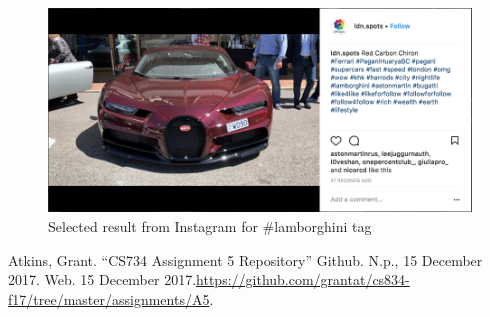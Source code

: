 \documentclass[letterpaper,11pt]{article}
\begin{document}
\begin{figure}[h]
\centering
\includegraphics[scale=0.4]{multi_class.png}
\caption{Selected result from Instagram for \#lamborghini tag}
\label{fig:bug}
\end{figure}


\clearpage


\clearpage



\begin{thebibliography}{9}
Atkins, Grant. ``CS734 Assignment 5 Repository'' Github. N.p., 15 December 2017. Web. 15 December 2017.\url{https://github.com/grantat/cs834-f17/tree/master/assignments/A5}.
\end{thebibliography}
\end{document}
